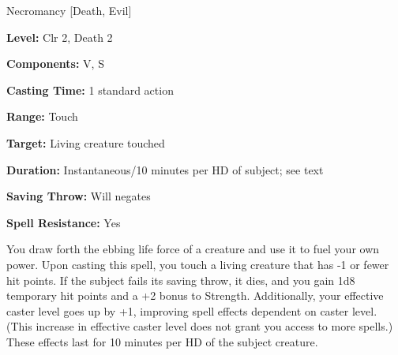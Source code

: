 
Necromancy [Death, Evil]

\textbf{Level:} Clr 2, Death 2

\textbf{Components:} V, S

\textbf{Casting Time:} 1 standard action

\textbf{Range:} Touch

\textbf{Target:} Living creature touched

\textbf{Duration:} Instantaneous/10 minutes per HD of subject; see text

\textbf{Saving Throw:} Will negates

\textbf{Spell Resistance:} Yes

You draw forth the ebbing life force of a creature and use it to fuel your own 
power. Upon casting this spell, you touch a living creature that has -1 or fewer 
hit points. If the subject fails its saving throw, it dies, and you gain 1d8 temporary 
hit points and a +2 bonus to Strength. Additionally, your effective caster level 
goes up by +1, improving spell effects dependent on caster level. (This increase 
in effective caster level does not grant you access to more spells.) These effects 
last for 10 minutes per HD of the subject creature.

